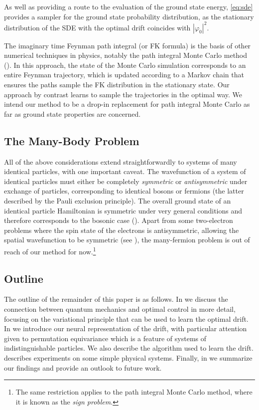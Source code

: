 \documentclass[12pt]{msml2020} %
\begin{document}

As well as providing a route to the evaluation of the ground state energy, \eqref{eq:sde} provides a sampler for the ground state probability distribution, as the stationary distribution of the SDE with the optimal drift coincides with $|\varphi_0|^2$.

The imaginary time Feynman path integral (or FK formula) is the basis of other numerical techniques in physics, notably the path integral Monte Carlo method (\cite{Ceperley:1995aa}). In this approach, the state of the Monte Carlo simulation corresponds to an entire Feynman trajectory, which is updated according to a Markov chain that ensures the paths sample the FK distribution in the stationary state. Our approach by contrast learns to sample the trajectories in the optimal way. We intend our method to be a drop-in replacement for path integral Monte Carlo as far as ground state properties are concerned.

\subsection{The Many-Body Problem}

All of the above considerations extend straightforwardly to systems of many identical particles, with one important caveat. The wavefunction of a system of identical particles must either be completely \emph{symmetric} or \emph{antisymmetric} under exchange of particles, corresponding to identical bosons or fermions (the latter described by the Pauli exclusion principle). The overall ground state of an identical particle Hamiltonian is symmetric under very general conditions and therefore corresponds to the bosonic case (\cite{Feynman:1998aa}). Apart from some two-electron problems where the spin state of the electrons is antisymmetric, allowing the spatial wavefunction to be symmetric (see ), the many-fermion problem is out of reach of our method for now.\footnote{The same restriction applies to the path integral Monte Carlo method, where it is known as the \emph{sign problem}.}

\subsection{Outline}

The outline of the remainder of this paper is as follows. In  we discuss the connection between quantum mechanics and optimal control in more detail, focusing on the variational principle that can be used to learn the optimal drift. In  we introduce our neural representation of the drift, with particular attention given to permutation equivariance which is a feature of systems of indistinguishable particles. We also describe the  algorithm used to learn the drift.  describes experiments on some simple physical systems. Finally, in  we summarize our findings and provide an outlook to future work.
\end{document}
